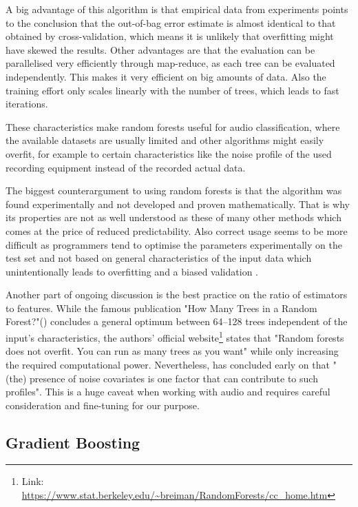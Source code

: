 A big advantage of this algorithm is that empirical data from experiments points to the conclusion that the out-of-bag error estimate is almost identical to that obtained by cross-validation, which means it is unlikely that overfitting might have skewed the results. Other advantages are that the evaluation can be parallelised very efficiently through map-reduce, as each tree can be evaluated independently. This makes it very efficient on big amounts of data. Also the training effort only scales linearly with the number of trees, which leads to fast iterations.

These characteristics make random forests useful for audio classification, where the available datasets are usually limited and other algorithms might easily overfit, for example to certain characteristics like the noise profile of the used recording equipment instead of the recorded actual data.

The biggest counterargument to using random forests is that the algorithm was found experimentally and not developed and proven mathematically. That is why its properties are not as well understood as these of many other methods which comes at the price of reduced predictability. Also correct usage seems to be more difficult as programmers tend to optimise the parameters experimentally on the test set and not based on general characteristics of the input data which unintentionally leads to overfitting and a biased validation \cite{StroblMalley}. 

Another part of ongoing discussion is the best practice on the ratio of estimators to features. While the famous publication "How Many Trees in a Random Forest?"(\cite{Oshiro}) concludes a general optimum between 64--128 trees independent of the input's characteristics, the authors' official website\footnote{Link: \url{https://www.stat.berkeley.edu/~breiman/RandomForests/cc_home.htm}} states that "Random forests does not overfit. You can run as many trees as you want" while only increasing the required computational power. Nevertheless, \cite{Segal} has concluded early on that "(the) presence of noise covariates is one factor that can contribute to such profiles". This is a huge caveat when working with audio and requires careful consideration and fine-tuning for our purpose. 




\subsection{Gradient Boosting}

